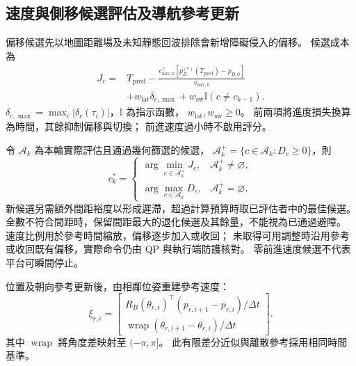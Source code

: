 \subsection{速度與側移候選評估及導航參考更新}
\label{subsec:candidate_reference_update}

偏移候選先以地圖距離場及未知靜態回波排除會新增障礙侵入的偏移。
候選成本為
\begin{equation}
    \begin{aligned}
        J_c={}&T_{\mathrm{pred}}
        -\frac{e_{\mathrm{nav},k}^\top
        [p_B^{(c)}(T_{\mathrm{pred}})-p_{B,0}]}
        {v_{\mathrm{nav},k}}\\
        &+w_{\mathrm{lat}}\delta_{c,\max}
        +w_{\mathrm{sw}}\mathbb I(c\ne c_{k-1}).
    \end{aligned}
    \label{eq:ch3_candidate_motion_cost}
\end{equation}
$\delta_{c,\max}=\max_i|\delta_c(\tau_i)|$，$\mathbb I$ 為指示函數，
$w_{\mathrm{lat}},w_{\mathrm{sw}}\geq0$。
前兩項將進度損失換算為時間，其餘抑制偏移與切換；
前進速度過小時不啟用評分。

令 $\mathcal A_k$ 為本輪實際評估且通過幾何篩選的候選，
$\mathcal A_k^+=\{c\in\mathcal A_k:D_c\geq0\}$，則
\begin{equation}
    c_k^*=
    \begin{cases}
        \displaystyle\arg\min_{c\in\mathcal A_k^+}J_c,
        &\mathcal A_k^+\ne\varnothing,\\[1mm]
        \displaystyle\arg\max_{c\in\mathcal A_k}D_c,
        &\mathcal A_k^+=\varnothing.
    \end{cases}
    \label{eq:ch3_candidate_selection_rule}
\end{equation}
新候選另需額外間距裕度以形成遲滯，超過計算預算時取已評估者中的最佳候選。
全數不符合間距時，保留間距最大的退化候選及其餘量，不能視為已通過避障。
速度比例用於參考時間縮放，偏移逐步加入或收回；
未取得可用調整時沿用參考或收回既有偏移，實際命令仍由 QP 與執行端防護核對。
零前進速度候選不代表平台可瞬間停止。

位置及朝向參考更新後，由相鄰位姿重建參考速度：
\begin{equation}
    \xi_{r,i}=
    \begin{bmatrix}
        R_B(\theta_{r,i})^\top
        (p_{r,i+1}-p_{r,i})/\Delta t\\
        \operatorname{wrap}(\theta_{r,i+1}-\theta_{r,i})/\Delta t
    \end{bmatrix}.
    \label{eq:ch3_reference_velocity_reconstruction}
\end{equation}
其中 $\operatorname{wrap}$ 將角度差映射至 $(-\pi,\pi]$。
此有限差分近似與離散參考採用相同時間基準。

